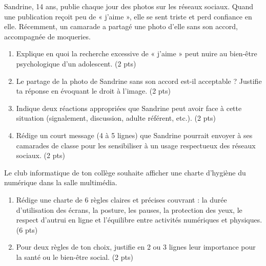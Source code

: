 \documentclass[11pt]{article}
\begin{document}
\begin{exercice}
Sandrine, 14 ans, publie chaque jour des photos sur les réseaux sociaux. Quand une publication reçoit peu de « j'aime », elle se sent triste et perd confiance en elle. Récemment, un camarade a partagé une photo d'elle sans son accord, accompagnée de moqueries.
\begin{enumerate}
\item Explique en quoi la recherche excessive de « j'aime » peut nuire au bien-être psychologique d'un adolescent. (2 pts)
\item Le partage de la photo de Sandrine sans son accord est-il acceptable ? Justifie ta réponse en évoquant le droit à l'image. (2 pts)
\item Indique deux réactions appropriées que Sandrine peut avoir face à cette situation (signalement, discussion, adulte référent, etc.). (2 pts)
\item Rédige un court message (4 à 5 lignes) que Sandrine pourrait envoyer à ses camarades de classe pour les sensibiliser à un usage respectueux des réseaux sociaux. (2 pts)
\end{enumerate}
\end{exercice}

\begin{exercice}
Le club informatique de ton collège souhaite afficher une charte d'hygiène du numérique dans la salle multimédia.
\begin{enumerate}
\item Rédige une charte de 6 règles claires et précises couvrant : la durée d'utilisation des écrans, la posture, les pauses, la protection des yeux, le respect d'autrui en ligne et l'équilibre entre activités numériques et physiques. (6 pts)
\item Pour deux règles de ton choix, justifie en 2 ou 3 lignes leur importance pour la santé ou le bien-être social. (2 pts)
\end{enumerate}
\end{exercice}
\end{document}
